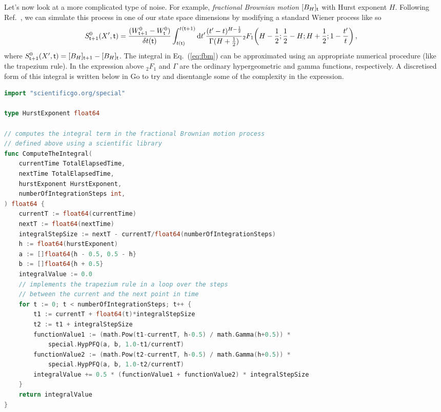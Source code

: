 \documentclass{book}
\begin{document}
Let's now look at a more complicated type of noise. For example, \emph{fractional Brownian motion} $[B_{H}]_{\sf t}$ with Hurst exponent $H$. Following Ref.~\cite{decreusefond1999stochastic}, we can simulate this process in one of our state space dimensions by modifying a standard Wiener process like so
\begin{align}
S^{0}_{{\sf t}+1}(X',{\sf t}) &= \frac{(W^0_{{\sf t}+1} - W^0_{\sf t})}{\delta t({\sf t})}\int^{t({\sf t}+1)}_{t({\sf t})}{\rm d}t' \frac{(t'-t)^{H-\frac{1}{2}}}{\Gamma (H+\frac{1}{2})} {}_2F_1 \bigg( H-\frac{1}{2};\frac{1}{2}-H;H+\frac{1}{2};1-\frac{t'}{t}\bigg) \label{eq:fbm} \,,
\end{align}
where $S^{0}_{{\sf t}+1}(X',{\sf t})=[B_{H}]_{{\sf t}+1}-[B_{H}]_{{\sf t}}$. The integral in Eq.~(\ref{eq:fbm}) can be approximated using an appropriate numerical procedure (like the trapezium rule). In the expression above ${}_2F_1$ and $\Gamma$ are the ordinary hypergeometric and gamma functions, respectively. A discretised form of this integral is written below in Go to try and disentangle some of the complexity in the expression.

\begin{lstlisting}[language=Go]
import "scientificgo.org/special"

type HurstExponent float64

// computes the integral term in the fractional Brownian motion process
// defined above using a scientific library
func ComputeTheIntegral(
	currentTime TotalElapsedTime,
	nextTime TotalElapsedTime,
	hurstExponent HurstExponent,
	numberOfIntegrationSteps int,
) float64 {
	currentT := float64(currentTime)
	nextT := float64(nextTime)
	integralStepSize := nextT - currentT/float64(numberOfIntegrationSteps)
	h := float64(hurstExponent)
	a := []float64{h - 0.5, 0.5 - h}
	b := []float64{h + 0.5}
	integralValue := 0.0
	// implements the trapezium rule in a loop over the steps
	// between the current and the next point in time
	for t := 0; t < numberOfIntegrationSteps; t++ {
		t1 := currentT + float64(t)*integralStepSize
		t2 := t1 + integralStepSize
		functionValue1 := (math.Pow(t1-currentT, h-0.5) / math.Gamma(h+0.5)) *
			special.HypPFQ(a, b, 1.0-t1/currentT)
		functionValue2 := (math.Pow(t2-currentT, h-0.5) / math.Gamma(h+0.5)) *
			special.HypPFQ(a, b, 1.0-t2/currentT)
		integralValue += 0.5 * (functionValue1 + functionValue2) * integralStepSize
	}
	return integralValue
}
\end{lstlisting}
\end{document}
